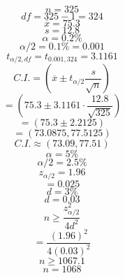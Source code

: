 \documentclass{article}
\begin{document}
    $$n=325$$
$$df = 325-1 = 324$$
$$\overline{x} = 75.3$$
$$s = 12.8$$
$$\alpha = 0.2\%$$
$$\alpha/2 = 0.1\% = 0.001$$
$$t_{\alpha/2, df} = t_{0.001, 324} = 3.1161$$
$$C.I. = (\overline{x} \pm t_{\alpha/2} \frac{s}{\sqrt{n}})$$
$$= (75.3 \pm 3.1161 \cdot \frac{12.8}{\sqrt{325}})$$
$$= (75.3 \pm 2.2125)$$
$$= (73.0875, 77.5125)$$
$$C.I. \approx (73.09, 77.51)$$
$$\alpha = 5\%$$
$$\alpha/2 = 2.5\%$$
$$z_{\alpha/2} = 1.96$$
$$= 0.025$$
$$d=3\%$$
$$d=0.03$$
$$n \ge \frac{z_{\alpha/2}^2}{4d^2}$$
$$= \frac{(1.96)^2}{4(0.03)^2}$$
$$n \ge 1067.1$$
$$n=1068$$

    
\end{document}
